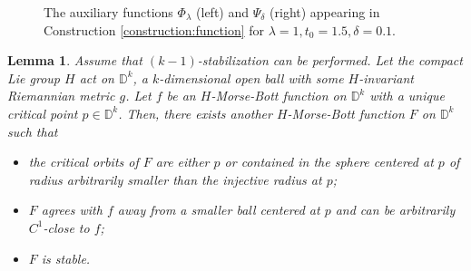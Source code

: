 \documentclass[11pt]{amsart}
\newtheorem{lemma}[theorem]{Lemma}
\theoremstyle{definition}
\numberwithin{equation}{subsection}
\begin{document}
\begin{figure}[htbp]
\centering
{}
\caption{The auxiliary functions $\Phi_{\lambda}$ (left) and $\Psi_\delta$ (right) appearing
in Construction \ref{construction:function} for $\lambda=1,t_0=1.5,\delta=0.1$.}
\label{fig:PhiPsi}
\end{figure}


\begin{lemma}\label{lem:induction}
    Assume that $(k-1)$-stabilization can be performed. Let the compact Lie group $H$ act on $\mathbb{D}^k$, a $k$-dimensional open ball with some $H$-invariant Riemannian metric $g$. Let $f$ be an $H$-Morse-Bott function on $\mathbb{D}^k$ with a unique critical point $p\in\mathbb{D}^k$. Then, there exists another $H$-Morse-Bott function $F$ on $\mathbb{D}^k$ such that
    \begin{itemize}
        \item the critical orbits of $F$ are either $p$ or contained in the sphere centered at $p$ of radius arbitrarily smaller than the injective radius at $p$;
        \item $F$ agrees with $f$ away from a smaller ball centered at $p$ and can be arbitrarily $C^1$-close to $f$;
        \item $F$ is stable.
    \end{itemize}
\end{lemma}
\end{document}
